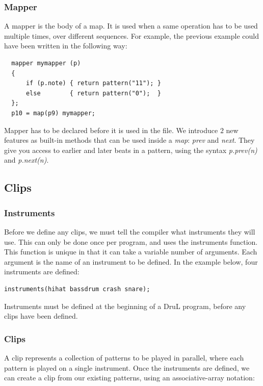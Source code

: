 \documentclass[11pt,twoside]{article}
\begin{document}
\subsubsection{Mapper}
A mapper is the body of a map. It is used when a same operation has to be
used multiple times, over different sequences.
For example, the previous example could have been written in the following
way:
\begin{verbatim}
  mapper mymapper (p)
  {
      if (p.note) { return pattern("11"); }
      else        { return pattern("0");  }
  };
  p10 = map(p9) mymapper;
\end{verbatim}
Mapper has to be declared before it is used in the file.
We introduce $2$ new features as built-in methods that can be used inside
a \textit{map}: \textit{prev} and \textit{next}. They give you access to
earlier and later beats in a pattern, using the syntax \textit{p.prev(n)}
and \textit{p.next(n)}. 


\subsection{Clips}

\subsubsection{Instruments}

Before we define any clips, we must tell the compiler what instruments they will use.
This can only be done once per program, and uses the instruments function.  This function is unique in that it can take a variable number of arguments.  Each argument is the name of an instrument to be defined.  In the example below, four instruments are defined:

\begin{verbatim}
instruments(hihat bassdrum crash snare);
\end{verbatim}

Instruments must be defined at the beginning of a DruL program, before any clips have been defined.

\subsubsection{Clips}

A clip represents a collection of patterns to be played in parallel, where each pattern is played on a single instrument.
Once the instruments are defined, we can create a clip from our existing patterns, using an
associative-array notation:
\end{document}
